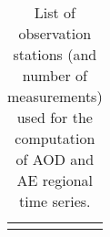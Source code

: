 \documentclass[journal abbreviation, manuscript]{copernicus}
\begin{document}
\begin{table}
\begin{tabularx}{\textwidth}{lX}
                                                                                                                                                                                                                                                                                                                                                                                                                                                                                                                                                                                                                                                                                                                                                                                                                                                                                                                                                                                   \\
  \bottomhline
 \end{tabularx}
 \caption{List of observation stations (and number of measurements) used for the computation of AOD and AE regional time series.}
 \label{table:stations_aerosun}
\end{table}

\clearpage
\end{document}
